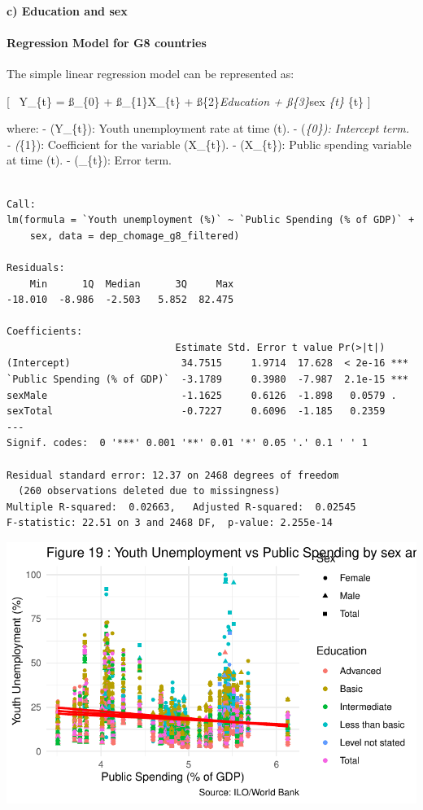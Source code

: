 \documentclass[
  letterpaper,
  DIV=11,
  numbers=noendperiod]{scrartcl}
\let\oldparagraph\paragraph
\renewcommand{\paragraph}[1]{\oldparagraph{#1}\mbox{}}
\begin{document}
\hypertarget{c-education-and-sex}{%
\paragraph{c) Education and sex}\label{c-education-and-sex}}

\hypertarget{regression-model-for-g8-countries}{%
\paragraph{Regression Model for G8
countries}\label{regression-model-for-g8-countries}}

The simple linear regression model can be represented as:

{[} ~Y\_\{t\} = ß\_\{0\} + ß\_\{1\}X\_\{t\} + ß\{2\}\emph{Education +
ß\{3\}}sex \varepsilon\emph{\{t\} \varepsilon}\{t\} {]}

where: - (Y\_\{t\}): Youth unemployment rate at time (t). -
(\beta\emph{\{0\}): Intercept term. - (\beta}\{1\}): Coefficient for the
variable (X\_\{t\}). - (X\_\{t\}): Public spending variable at time (t).
- (\epsilon\_\{t\}): Error term.

\begin{verbatim}

Call:
lm(formula = `Youth unemployment (%)` ~ `Public Spending (% of GDP)` + 
    sex, data = dep_chomage_g8_filtered)

Residuals:
    Min      1Q  Median      3Q     Max 
-18.010  -8.986  -2.503   5.852  82.475 

Coefficients:
                             Estimate Std. Error t value Pr(>|t|)    
(Intercept)                   34.7515     1.9714  17.628  < 2e-16 ***
`Public Spending (% of GDP)`  -3.1789     0.3980  -7.987  2.1e-15 ***
sexMale                       -1.1625     0.6126  -1.898   0.0579 .  
sexTotal                      -0.7227     0.6096  -1.185   0.2359    
---
Signif. codes:  0 '***' 0.001 '**' 0.01 '*' 0.05 '.' 0.1 ' ' 1

Residual standard error: 12.37 on 2468 degrees of freedom
  (260 observations deleted due to missingness)
Multiple R-squared:  0.02663,   Adjusted R-squared:  0.02545 
F-statistic: 22.51 on 3 and 2468 DF,  p-value: 2.255e-14
\end{verbatim}

\includegraphics{Projet-BM_files/figure-pdf/unnamed-chunk-47-1.pdf}
\end{document}
